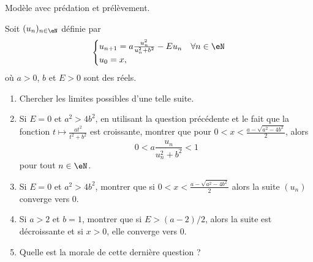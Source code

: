 
\begin{exercice}\label{exoTD3-0014}

	Modèle avec prédation et prélèvement.

	Soit $(u_n)_{n\in\eN}$ définie par
	\begin{equation}
		\begin{cases}
			u_{n+1}=a\frac{ u_n^2 }{ u_n^2+b^2 }-Eu_n	&	\text{$\forall n\in\eN$}\\
			u_0=x,
		\end{cases}
	\end{equation}
	où $a>0$, $b$ et $E>0$ sont des réels.
	\begin{enumerate}
		\item
			Chercher les limites possibles d'une telle suite.
		\item
			Si $E=0$ et $a^2>4b^2$, en utilisant la question précédente et le fait que la fonction $t\mapsto\frac{ at^2 }{ t^2+b^2 }$ est croissante, montrer que pour $0<x<\frac{ a-\sqrt{a^2-4b^2} }{ 2 }$, alors
			\begin{equation}
				0<a\frac{ u_n }{ u_n^2+b^2 }<1
			\end{equation}
			pour tout $n\in\eN$.
		\item
			Si $E=0$ et $a^2>4b^2$, montrer que si $0<x<\frac{ a-\sqrt{a^2-4b^2} }{2}$ alors la suite $(u_n)$ converge vers 0.
		\item
			Si $a>2$ et $b=1$, montrer que si $E>(a-2)/2$, alors la suite est décroissante et si $x>0$, elle converge vers 0.
		\item
			Quelle est la morale de cette dernière question ?
	\end{enumerate}

\end{exercice}

